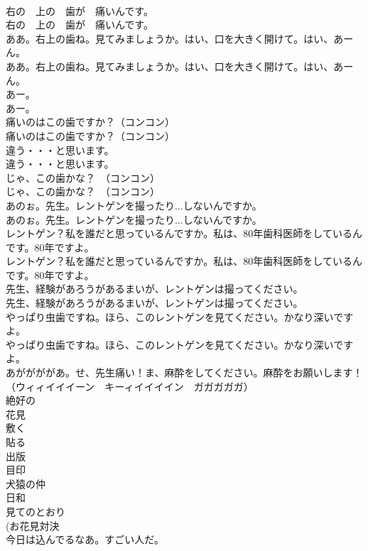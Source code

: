 \documentclass[8pt]{extreport}
\begin{document}
\begin{CJK}{UTF8}{min}
\\	右の　上の　歯が　痛いんです。	
\\	右の　上の　歯が　痛いんです。 
\\	ああ。右上の歯ね。見てみましょうか。はい、口を大きく開けて。はい、あーん。	
\\	ああ。右上の歯ね。見てみましょうか。はい、口を大きく開けて。はい、あーん。 
\\	あー。	
\\	あー。 
\\	痛いのはこの歯ですか？（コンコン）	
\\	痛いのはこの歯ですか？（コンコン） 
\\	違う・・・と思います。	
\\	違う・・・と思います。 
\\	じゃ、この歯かな？　（コンコン）	
\\	じゃ、この歯かな？　（コンコン） 
\\	あのぉ。先生。レントゲンを撮ったり...しないんですか。	
\\	あのぉ。先生。レントゲンを撮ったり...しないんですか。 
\\	レントゲン？私を誰だと思っているんですか。私は、80年歯科医師をしているんです。80年ですよ。	
\\	レントゲン？私を誰だと思っているんですか。私は、80年歯科医師をしているんです。80年ですよ。 
\\	先生、経験があろうがあるまいが、レントゲンは撮ってください。	
\\	先生、経験があろうがあるまいが、レントゲンは撮ってください。 
\\	やっぱり虫歯ですね。ほら、このレントゲンを見てください。かなり深いですよ。	
\\	やっぱり虫歯ですね。ほら、このレントゲンを見てください。かなり深いですよ。 
\\	あががががあ。せ、先生痛い！ま、麻酔をしてください。麻酔をお願いします！	
\\	（ウィィイイイーン　キーィイイイイン　ガガガガガ）	
\\	絶好の
\\	花見
\\	敷く
\\	貼る
\\	出版
\\	目印
\\	犬猿の仲
\\	日和
\\	見てのとおり
\\	(お花見対決 
\\	今日は込んでるなあ。すごい人だ。	

\end{CJK}
\end{document}
